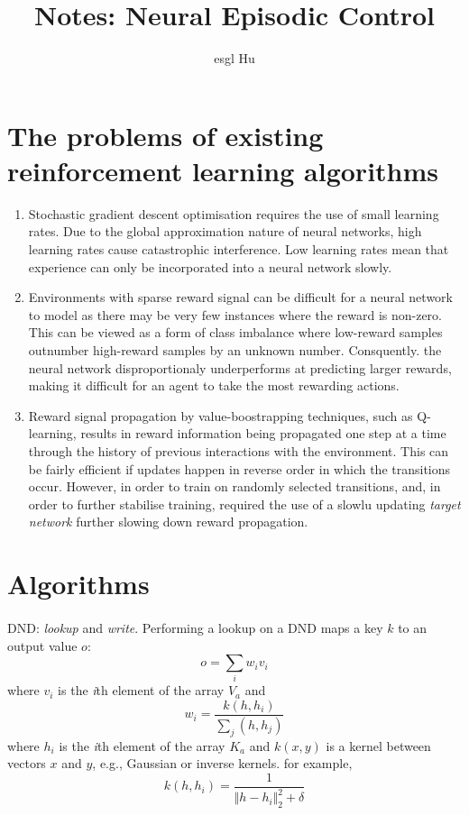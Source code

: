 \documentclass[12pt,a4paper]{article}
\begin{document}
\title{Notes: Neural Episodic Control}
\author{esgl Hu}
\maketitle
\section{The problems of existing reinforcement learning algorithms} \cite{Pritzel2017Neural}
\begin{enumerate}
			\item Stochastic gradient descent optimisation requires the use of small learning rates. Due to the global approximation nature of neural networks, high learning rates cause catastrophic interference. Low learning rates mean that experience can only be incorporated into a neural network slowly.
			\item Environments with sparse reward signal can be difficult for a neural network to model as there may be very few instances where the reward is non-zero. This can be viewed as a form of class imbalance where low-reward samples outnumber high-reward samples by an unknown number. Consquently. the neural network disproportionaly underperforms at predicting larger rewards, making it difficult for an agent to take the most rewarding actions.
			\item Reward signal propagation by value-boostrapping techniques, such as Q-learning, results in reward information being propagated one step at a time through the history of previous interactions with the environment. This can be fairly efficient if updates happen in reverse order in which the transitions occur. However, in order to train on randomly selected transitions, and, in order to further stabilise training, required the use of a slowlu updating \textit{target network} further slowing down reward propagation.
\end{enumerate}

\section{Algorithms}
\paragraph{} DND: \textit{lookup} and \textit{write}. Performing a lookup on a DND maps a key $k$ to an output value $o$:
\begin{equation}\label{equation_1}
o = \sum_{i}w_{i}v_{i}
\end{equation}
where $v_{i}$ is the \textit{i}th element of the array $V_{a}$ and 
\begin{equation} \label{equation_2}
w_{i} = \frac{k(h, h_{i})}{\sum_{j}(h, h_{j})}
\end{equation}
where $h_{i}$ is the \textit{i}th element of the array $K_{a}$ and $k(x, y)$ is a kernel between vectors $x$ and $y$, e.g., Gaussian or inverse kernels. for example, 
\begin{equation}
k(h, h_{i}) = \frac{1}{{\Vert h - h_{i} \Vert}_{2}^{2} + \delta}
\end{equation}
\end{document}
